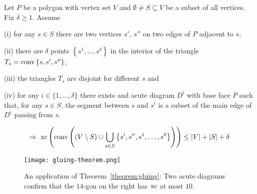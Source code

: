 \begin{theorem}\label{theorem:gluing}
  Let $P$ be a polygon with vertex set $V$ and $\emptyset \neq S \subseteq V$ be a subset of all vertices. Fix $\delta \geq 1$. Assume

  (i) for any $s \in S$ there are two vertices $s'$, $s''$ on two edges of $P$ adjacent to $s$,

  (ii) there are $\delta$ points $\left\{s^1, \dots, s^\delta \right\}$ in the interior of the triangle ${T_s = \operatorname{conv} \left\{s,s',s''\right\}}$,
  
  (iii) the triangles $T_s$ are disjoint for different $s$ and

  (iv) for any $i \in \{1,\dots,\delta\}$ there exists and acute diagram $D^i$ with base face $P$ such that, for any $s \in S$, the segment between $s$ and $s^i$ is a subset of the main edge of $D^i$ passing from $s$. 
  
  $$\Rightarrow \ \operatorname{xc}\left( \operatorname{conv}\left( (V \setminus S) \cup \bigcup_{s \in S} \left\{ s',s'',s^1,\dots,s^\delta \right\}  \right) \right) \leq \lvert V\rvert + \lvert S\rvert + \delta$$
\end{theorem}

\begin{figure}[ht]
  \centering
  \texttt{[image: gluing-theorem.png]}
  \caption{An application of Theorem~\ref{theorem:gluing}: Two acute diagrams confirm that the $14$-gon on the right has $\operatorname{xc}$ at most $10$. \cite[Figure 3]{shitov2020sublinear}}
  \label{fig:gluing-theorem}
\end{figure}


